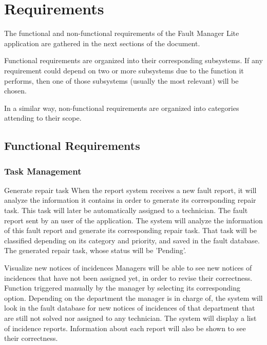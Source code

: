
\chapter{Requirements}
\label{chapRequirements}

The functional and non-functional requirements of the Fault Manager Lite application are gathered in the next sections of the document.

Functional requirements are organized into their corresponding subsystems. If any requirement could depend on two or more subsystems due to the function it performs, then one of those subsystems (usually the most relevant) will be chosen.

In a similar way, non-functional requirements are organized into categories attending to their scope.

\section{Functional Requirements}

\subsection{Task Management}

\begin{requirement}{Generate repair task}
\reqdesc When the report system receives a new fault report, it will analyze the information it contains in order to generate its corresponding repair task. This task will later be automatically assigned to a technician.
\reqin The fault report sent by an user of the application.
\reqsteps The system will analyze the information of this fault report and generate its corresponding repair task. That task will be classified depending on its category and priority, and saved in the fault database.
\reqout The generated repair task, whose status will be 'Pending'.
\end{requirement}

\begin{requirement}{Visualize new notices of incidences}
\reqdesc Managers will be able to see new notices of incidences that have not been assigned yet, in order to revise their correctness.
\reqin Function triggered manually by the manager by selecting its corresponding option.
\reqsteps Depending on the department the manager is in charge of, the system will look in the fault database for new notices of incidences of that department that are still not solved nor assigned to any technician.
\reqout The system will display a list of incidence reports. Information about each report will also be shown to see their correctness.
\end{requirement}

